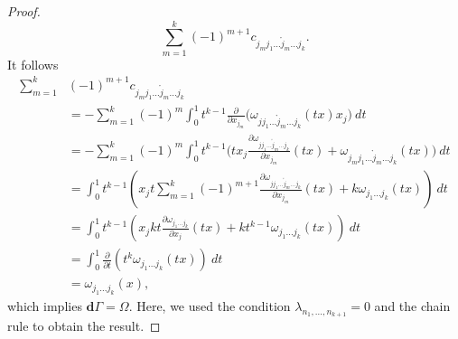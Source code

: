 \begin{proof}
\begin{equation*}
	\sum_{m=1}^{k} (-1)^{m+1} c_{j_mj_1\dots\mathring j_{m}\dots j_k}.
\end{equation*}
It follows
\begin{equation*}
\begin{aligned}
\sum_{m=1}^{k} &(-1)^{m+1} c_{j_mj_1\dots\mathring j_{m}\dots j_k} \\
	& = -\sum_{m=1}^k (-1)^m \int_0^1 t^{k-1} \frac{\partial}{\partial x_{j_m}}\big( \omega_{jj_1\dots\mathring j_m\dots j_k}(tx) x_j \big)\ dt \\
	& = -\sum_{m=1}^k (-1)^m \int_0^1 t^{k-1} \big( tx_j\frac{\partial \omega_{jj_1\dots\mathring j_m\dots j_k} }{\partial x_{j_m}}(tx) + \omega_{j_mj_1\dots\mathring j_m\dots j_k}(tx)  \big)\ dt \\
       & = \int_0^1 t^{k-1} \left( x_j t \sum_{m=1}^{k} (-1)^{m+1}\frac{\partial \omega_{jj_1\dots\mathring j_m\dots j_k}}{\partial x_{j_m}}(tx) + k \omega_{j_1\dots j_k}(tx)  \right) \ dt \\
       & = \int_0^1 t^{k-1} \left( x_j k t \frac{\partial \omega_{j_1\dots j_k}}{\partial x_j}(tx) + kt^{k-1} \omega_{j_1\dots j_k}(tx)\right)\ dt \\
       & = \int_0^1 \frac{\partial}{\partial t}(t^k \omega_{j_1\dots j_k}(tx) )\ dt \\
      	& = \omega_{j_1\dots j_k}(x),
\end{aligned}
\end{equation*}
which implies $\mathbf d \Gamma = \Omega$. Here, we used the condition $\lambda_{n_1,\dots,n_{k+1}} = 0$ and the chain rule to obtain the result.
\end{proof}


